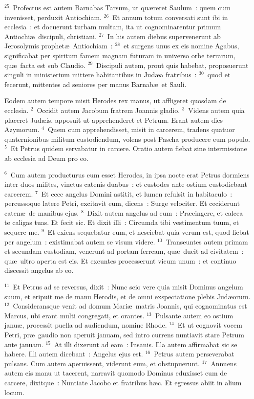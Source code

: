 ${}^{25}$~Profectus est autem Barnabas Tarsum, ut qu\ae reret Saulum~: quem cum invenisset, perduxit Antiochiam.
${}^{26}$~Et annum totum conversati sunt ibi in ecclesia~: et docuerunt turbam multam, ita ut cognominarentur primum Antiochi\ae\ discipuli, christiani.
${}^{27}$~In his autem diebus supervenerunt ab Jerosolymis prophet\ae\ Antiochiam~:
${}^{28}$~et surgens unus ex eis nomine Agabus, significabat per spiritum famem magnam futuram in universo orbe terrarum, qu\ae\ facta est sub Claudio.
${}^{29}$~Discipuli autem, prout quis habebat, proposuerunt singuli in ministerium mittere habitantibus in Jud\ae a fratribus~:
${}^{30}$~quod et fecerunt, mittentes ad seniores per manus Barnab\ae\ et Sauli.

\lettrine[lines=3,image=true,loversize=0.05,lraise=-0.03]{E}{}odem autem tempore misit Herodes rex manus, ut affligeret quosdam de ecclesia.
${}^{2}$~Occidit autem Jacobum fratrem Joannis gladio.
${}^{3}$~Videns autem quia placeret Jud\ae is, apposuit ut apprehenderet et Petrum. Erant autem dies Azymorum.
${}^{4}$~Quem cum apprehendisset, misit in carcerem, tradens quatuor quaternionibus militum custodiendum, volens post Pascha producere eum populo.
${}^{5}$~Et Petrus quidem servabatur in carcere. Oratio autem fiebat sine intermissione ab ecclesia ad Deum pro eo.


${}^{6}$~Cum autem producturus eum esset Herodes, in ipsa nocte erat Petrus dormiens inter duos milites, vinctus catenis duabus~: et custodes ante ostium custodiebant carcerem.
${}^{7}$~Et ecce angelus Domini astitit, et lumen refulsit in habitaculo~: percussoque latere Petri, excitavit eum, dicens~: Surge velociter. Et ceciderunt caten\ae\ de manibus ejus.
${}^{8}$~Dixit autem angelus ad eum~: Pr\ae cingere, et calcea te caligas tuas. Et fecit sic. Et dixit illi~: Circumda tibi vestimentum tuum, et sequere me.
${}^{9}$~Et exiens sequebatur eum, et nesciebat quia verum est, quod fiebat per angelum~: existimabat autem se visum videre.
${}^{10}$~Transeuntes autem primam et secundam custodiam, venerunt ad portam ferream, qu\ae\ ducit ad civitatem~: qu\ae\ ultro aperta est eis. Et exeuntes processerunt vicum unum~: et continuo discessit angelus ab eo.


${}^{11}$~Et Petrus ad se reversus, dixit~: Nunc scio vere quia misit Dominus angelum suum, et eripuit me de manu Herodis, et de omni exspectatione plebis Jud\ae orum.
${}^{12}$~Consideransque venit ad domum Mari\ae\ matris Joannis, qui cognominatus est Marcus, ubi erant multi congregati, et orantes.
${}^{13}$~Pulsante autem eo ostium janu\ae , processit puella ad audiendum, nomine Rhode.
${}^{14}$~Et ut cognovit vocem Petri, pr\ae\ gaudio non aperuit januam, sed intro currens nuntiavit stare Petrum ante januam.
${}^{15}$~At illi dixerunt ad eam~: Insanis. Illa autem affirmabat sic se habere. Illi autem dicebant~: Angelus ejus est.
${}^{16}$~Petrus autem perseverabat pulsans. Cum autem aperuissent, viderunt eum, et obstupuerunt.
${}^{17}$~Annuens autem eis manu ut tacerent, narravit quomodo Dominus eduxisset eum de carcere, dixitque~: Nuntiate Jacobo et fratribus h\ae c. Et egressus abiit in alium locum.


